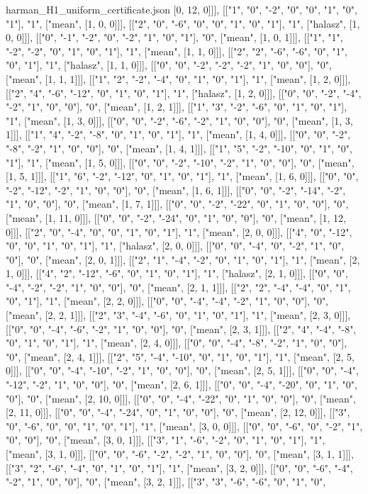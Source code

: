 \begin{filecontents*}[overwrite]{harman_H1_uniform_certificate.json}
[0, 12, 0]]], [["1", "0", "-2", "0", "0", "1", "0", "1"], "1", ["mean", [1, 0, 0]]], [["2", "0", "-6", "0", "0", "1", "0", "1"], "1", ["halasz", [1, 0, 0]]], [["0", "-1", "-2", "0", "-2", "1", "0", "1"], "0", ["mean", [1, 0, 1]]], [["1", "1", "-2", "-2", "0", "1", "0", "1"], "1", ["mean", [1, 1, 0]]], [["2", "2", "-6", "-6", "0", "1", "0", "1"], "1", ["halasz", [1, 1, 0]]], [["0", "0", "-2", "-2", "-2", "1", "0", "0"], "0", ["mean", [1, 1, 1]]], [["1", "2", "-2", "-4", "0", "1", "0", "1"], "1", ["mean", [1, 2, 0]]], [["2", "4", "-6", "-12", "0", "1", "0", "1"], "1", ["halasz", [1, 2, 0]]], [["0", "0", "-2", "-4", "-2", "1", "0", "0"], "0", ["mean", [1, 2, 1]]], [["1", "3", "-2", "-6", "0", "1", "0", "1"], "1", ["mean", [1, 3, 0]]], [["0", "0", "-2", "-6", "-2", "1", "0", "0"], "0", ["mean", [1, 3, 1]]], [["1", "4", "-2", "-8", "0", "1", "0", "1"], "1", ["mean", [1, 4, 0]]], [["0", "0", "-2", "-8", "-2", "1", "0", "0"], "0", ["mean", [1, 4, 1]]], [["1", "5", "-2", "-10", "0", "1", "0", "1"], "1", ["mean", [1, 5, 0]]], [["0", "0", "-2", "-10", "-2", "1", "0", "0"], "0", ["mean", [1, 5, 1]]], [["1", "6", "-2", "-12", "0", "1", "0", "1"], "1", ["mean", [1, 6, 0]]], [["0", "0", "-2", "-12", "-2", "1", "0", "0"], "0", ["mean", [1, 6, 1]]], [["0", "0", "-2", "-14", "-2", "1", "0", "0"], "0", ["mean", [1, 7, 1]]], [["0", "0", "-2", "-22", "0", "1", "0", "0"], "0", ["mean", [1, 11, 0]]], [["0", "0", "-2", "-24", "0", "1", "0", "0"], "0", ["mean", [1, 12, 0]]], [["2", "0", "-4", "0", "0", "1", "0", "1"], "1", ["mean", [2, 0, 0]]], [["4", "0", "-12", "0", "0", "1", "0", "1"], "1", ["halasz", [2, 0, 0]]], [["0", "0", "-4", "0", "-2", "1", "0", "0"], "0", ["mean", [2, 0, 1]]], [["2", "1", "-4", "-2", "0", "1", "0", "1"], "1", ["mean", [2, 1, 0]]], [["4", "2", "-12", "-6", "0", "1", "0", "1"], "1", ["halasz", [2, 1, 0]]], [["0", "0", "-4", "-2", "-2", "1", "0", "0"], "0", ["mean", [2, 1, 1]]], [["2", "2", "-4", "-4", "0", "1", "0", "1"], "1", ["mean", [2, 2, 0]]], [["0", "0", "-4", "-4", "-2", "1", "0", "0"], "0", ["mean", [2, 2, 1]]], [["2", "3", "-4", "-6", "0", "1", "0", "1"], "1", ["mean", [2, 3, 0]]], [["0", "0", "-4", "-6", "-2", "1", "0", "0"], "0", ["mean", [2, 3, 1]]], [["2", "4", "-4", "-8", "0", "1", "0", "1"], "1", ["mean", [2, 4, 0]]], [["0", "0", "-4", "-8", "-2", "1", "0", "0"], "0", ["mean", [2, 4, 1]]], [["2", "5", "-4", "-10", "0", "1", "0", "1"], "1", ["mean", [2, 5, 0]]], [["0", "0", "-4", "-10", "-2", "1", "0", "0"], "0", ["mean", [2, 5, 1]]], [["0", "0", "-4", "-12", "-2", "1", "0", "0"], "0", ["mean", [2, 6, 1]]], [["0", "0", "-4", "-20", "0", "1", "0", "0"], "0", ["mean", [2, 10, 0]]], [["0", "0", "-4", "-22", "0", "1", "0", "0"], "0", ["mean", [2, 11, 0]]], [["0", "0", "-4", "-24", "0", "1", "0", "0"], "0", ["mean", [2, 12, 0]]], [["3", "0", "-6", "0", "0", "1", "0", "1"], "1", ["mean", [3, 0, 0]]], [["0", "0", "-6", "0", "-2", "1", "0", "0"], "0", ["mean", [3, 0, 1]]], [["3", "1", "-6", "-2", "0", "1", "0", "1"], "1", ["mean", [3, 1, 0]]], [["0", "0", "-6", "-2", "-2", "1", "0", "0"], "0", ["mean", [3, 1, 1]]], [["3", "2", "-6", "-4", "0", "1", "0", "1"], "1", ["mean", [3, 2, 0]]], [["0", "0", "-6", "-4", "-2", "1", "0", "0"], "0", ["mean", [3, 2, 1]]], [["3", "3", "-6", "-6", "0", "1", "0", 
\end{filecontents*}
